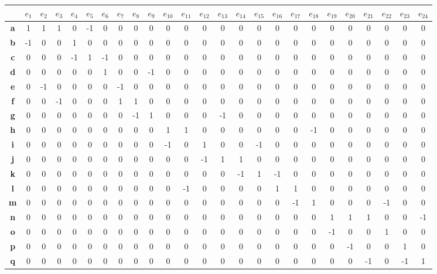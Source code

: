 \documentclass[a4paper,12pt]{article}
\begin{document}
\begin{center}
\tiny
\begin{tabular*}{\textwidth}{c|@{\extracolsep{\fill}}cccccccccccccccccccccccc}
\rowcolor[gray]{0.9}
 & \textbf{$e_1$} & \textbf{$e_2$} & \textbf{$e_3$} & \textbf{$e_4$} & \textbf{$e_5$} & \textbf{$e_6$} & \textbf{$e_7$} & \textbf{$e_8$} & \textbf{$e_9$} & \textbf{$e_{10}$} & \textbf{$e_{11}$} & \textbf{$e_{12}$} & \textbf{$e_{13}$} & \textbf{$e_{14}$} & \textbf{$e_{15}$} & \textbf{$e_{16}$} & \textbf{$e_{17}$} & \textbf{$e_{18}$} & \textbf{$e_{19}$} & \textbf{$e_{20}$} & \textbf{$e_{21}$} & \textbf{$e_{22}$} & \textbf{$e_{23}$} & \textbf{$e_{24}$} \\
\hline
\textbf{a} & 1& 1& 1& 0&-1& 0& 0& 0& 0& 0& 0& 0& 0& 0& 0& 0& 0& 0& 0& 0& 0& 0& 0& 0 \\
\textbf{b} &-1& 0& 0& 1& 0& 0& 0& 0& 0& 0& 0& 0& 0& 0& 0& 0& 0& 0& 0& 0& 0& 0& 0& 0 \\
\textbf{c} & 0& 0& 0&-1& 1&-1& 0& 0& 0& 0& 0& 0& 0& 0& 0& 0& 0& 0& 0& 0& 0& 0& 0& 0 \\
\textbf{d} & 0& 0& 0& 0& 0& 1& 0& 0&-1& 0& 0& 0& 0& 0& 0& 0& 0& 0& 0& 0& 0& 0& 0& 0 \\
\textbf{e} & 0&-1& 0& 0& 0& 0&-1& 0& 0& 0& 0& 0& 0& 0& 0& 0& 0& 0& 0& 0& 0& 0& 0& 0 \\
\textbf{f} & 0& 0&-1& 0& 0& 0& 1& 1& 0& 0& 0& 0& 0& 0& 0& 0& 0& 0& 0& 0& 0& 0& 0& 0 \\
\textbf{g} & 0& 0& 0& 0& 0& 0& 0&-1& 1& 0& 0& 0&-1& 0& 0& 0& 0& 0& 0& 0& 0& 0& 0& 0 \\
\textbf{h} & 0& 0& 0& 0& 0& 0& 0& 0& 0& 1& 1& 0& 0& 0& 0& 0& 0&-1& 0& 0& 0& 0& 0& 0 \\
\textbf{i} & 0& 0& 0& 0& 0& 0& 0& 0& 0&-1& 0& 1& 0& 0&-1& 0& 0& 0& 0& 0& 0& 0& 0& 0 \\
\textbf{j} & 0& 0& 0& 0& 0& 0& 0& 0& 0& 0& 0&-1& 1& 1& 0& 0& 0& 0& 0& 0& 0& 0& 0& 0 \\
\textbf{k} & 0& 0& 0& 0& 0& 0& 0& 0& 0& 0& 0& 0& 0&-1& 1&-1& 0& 0& 0& 0& 0& 0& 0& 0 \\
\textbf{l} & 0& 0& 0& 0& 0& 0& 0& 0& 0& 0&-1& 0& 0& 0& 0& 1& 1& 0& 0& 0& 0& 0& 0& 0 \\
\textbf{m} & 0& 0& 0& 0& 0& 0& 0& 0& 0& 0& 0& 0& 0& 0& 0& 0&-1& 1& 0& 0& 0&-1& 0& 0 \\
\textbf{n} & 0& 0& 0& 0& 0& 0& 0& 0& 0& 0& 0& 0& 0& 0& 0& 0& 0& 0& 1& 1& 1& 0& 0&-1 \\
\textbf{o} & 0& 0& 0& 0& 0& 0& 0& 0& 0& 0& 0& 0& 0& 0& 0& 0& 0& 0&-1& 0& 0& 1& 0& 0 \\
\textbf{p} & 0& 0& 0& 0& 0& 0& 0& 0& 0& 0& 0& 0& 0& 0& 0& 0& 0& 0& 0&-1& 0& 0& 1& 0 \\
\textbf{q} & 0& 0& 0& 0& 0& 0& 0& 0& 0& 0& 0& 0& 0& 0& 0& 0& 0& 0& 0& 0&-1& 0&-1& 1 \\
\end{tabular*}
\end{center}
\end{document}
